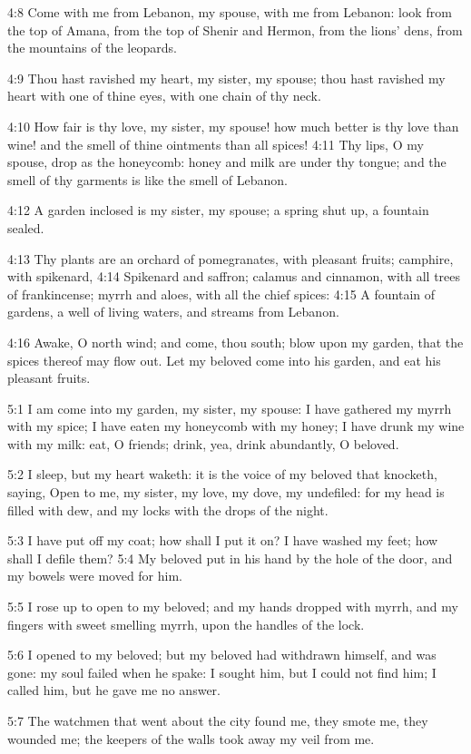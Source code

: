 4:8 Come with me from Lebanon, my spouse, with me from Lebanon: look
from the top of Amana, from the top of Shenir and Hermon, from the
lions' dens, from the mountains of the leopards.

4:9 Thou hast ravished my heart, my sister, my spouse; thou hast
ravished my heart with one of thine eyes, with one chain of thy neck.

4:10 How fair is thy love, my sister, my spouse! how much better is
thy love than wine! and the smell of thine ointments than all spices!
4:11 Thy lips, O my spouse, drop as the honeycomb: honey and milk are
under thy tongue; and the smell of thy garments is like the smell of
Lebanon.

4:12 A garden inclosed is my sister, my spouse; a spring shut up, a
fountain sealed.

4:13 Thy plants are an orchard of pomegranates, with pleasant fruits;
camphire, with spikenard, 4:14 Spikenard and saffron; calamus and
cinnamon, with all trees of frankincense; myrrh and aloes, with all
the chief spices: 4:15 A fountain of gardens, a well of living waters,
and streams from Lebanon.

4:16 Awake, O north wind; and come, thou south; blow upon my garden,
that the spices thereof may flow out. Let my beloved come into his
garden, and eat his pleasant fruits.

5:1 I am come into my garden, my sister, my spouse: I have gathered my
myrrh with my spice; I have eaten my honeycomb with my honey; I have
drunk my wine with my milk: eat, O friends; drink, yea, drink
abundantly, O beloved.

5:2 I sleep, but my heart waketh: it is the voice of my beloved that
knocketh, saying, Open to me, my sister, my love, my dove, my
undefiled: for my head is filled with dew, and my locks with the drops
of the night.

5:3 I have put off my coat; how shall I put it on? I have washed my
feet; how shall I defile them?  5:4 My beloved put in his hand by the
hole of the door, and my bowels were moved for him.

5:5 I rose up to open to my beloved; and my hands dropped with myrrh,
and my fingers with sweet smelling myrrh, upon the handles of the
lock.

5:6 I opened to my beloved; but my beloved had withdrawn himself, and
was gone: my soul failed when he spake: I sought him, but I could not
find him; I called him, but he gave me no answer.

5:7 The watchmen that went about the city found me, they smote me,
they wounded me; the keepers of the walls took away my veil from me.

